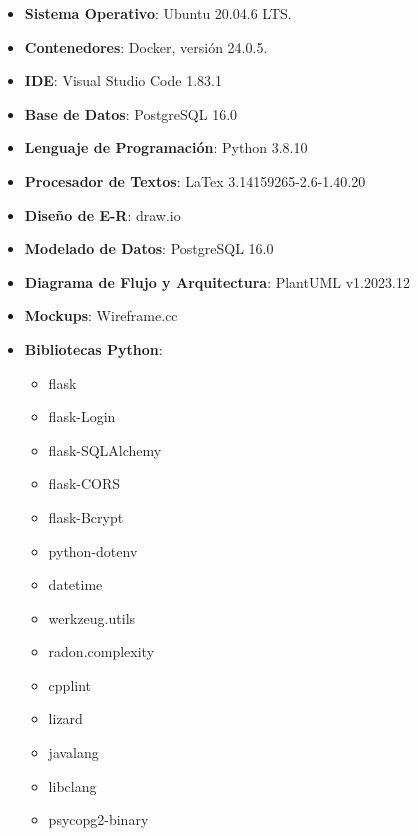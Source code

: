\begin{appendices}
\begin{itemize}
    \item \textbf{Sistema Operativo}: Ubuntu 20.04.6 LTS.
    \item \textbf{Contenedores}: Docker, versión 24.0.5.
    \item \textbf{IDE}: Visual Studio Code 1.83.1
    \item \textbf{Base de Datos}: PostgreSQL 16.0
    \item \textbf{Lenguaje de Programación}: Python 3.8.10
    \item \textbf{Procesador de Textos}: LaTex 3.14159265-2.6-1.40.20
    \item \textbf{Diseño de E-R}: draw.io
    \item \textbf{Modelado de Datos}: PostgreSQL 16.0
    \item \textbf{Diagrama de Flujo y Arquitectura}: PlantUML v1.2023.12
    \item \textbf{Mockups}: Wireframe.cc
    \item \textbf{Bibliotecas Python}:
    \begin{multicols}{2}
        \begin{itemize}
            \item flask \cite{flask}
            \item flask-Login \cite{flask-login}
            \item flask-SQLAlchemy \cite{flask-sqlalchemy}
            \item flask-CORS \cite{flask-cors}
            \item flask-Bcrypt \cite{flask-bcrypt}
            \item python-dotenv \cite{python-dotenv}
            \item datetime \cite{datetime}
            \item werkzeug.utils \cite{werkzeug}
            \item radon.complexity \cite{radon}
            \item cpplint \cite{cpplint}
            \item lizard \cite{lizard}
            \item javalang \cite{javalang}
            \item libclang \cite{libclang}
            \item psycopg2-binary \cite{psycopg2binary}
        \end{itemize}
    \end{multicols}
\end{itemize}


\end{appendices}
